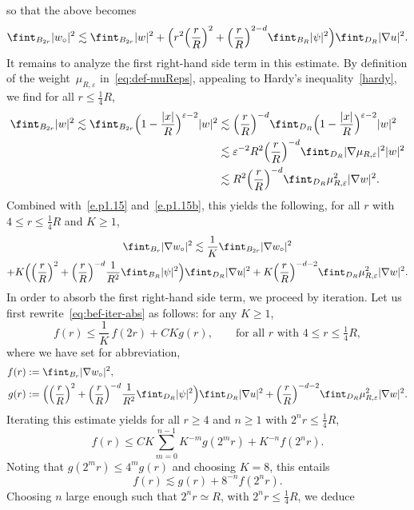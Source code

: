 \documentclass[10pt]{amsart}
\theoremstyle{plain}
\theoremstyle{definition}
\newcommand{\e}{\varepsilon}
\begin{document}
so that the above becomes
\begin{equation}\label{e.p1.15b}
\fint_{B_{2r}} |w_\circ|^2 \lesssim \fint_{B_{2r}} |w|^2 + \Big(r^2\Bigl(\frac{r}{R}\Bigr)^2+\Bigl(\frac{r}{R}\Bigr)^{2-d}\fint_{B_{R}} |\psi|^2\Big) \fint_{D_R}|\nabla u|^2.
\end{equation}
It remains to analyze the first right-hand side term in this estimate.
By definition of the weight~$\mu_{R,\e}$ in~\eqref{eq:def-muReps}, appealing to Hardy's inequality~\eqref{hardy},
we find for all $r\le \frac14R$,
\begin{align*}
\fint_{B_{2r}} |w|^2 \lesssim \fint_{B_{2r}} \Big(1-\frac{|x|}{R}\Big)^{\e-2} |w|^2
&\lesssim \Bigl(\frac{r}{R}\Bigr)^{-d} \fint_{D_{R}} \Big(1-\frac{|x|}{R}\Big)^{\e-2}|w|^2\\
&\lesssim \e^{-2} R^2\Bigl(\frac{r}{R}\Bigr)^{-d} \fint_{D_{R}} |\nabla \mu_{R,\e}|^2 |w|^2\\
&\lesssim R^2\Bigl(\frac{r}{R}\Bigr)^{-d}\fint_{D_R} \mu_{R,\e}^2 |\nabla w|^2.
\end{align*}
Combined with~\eqref{e.p1.15} and~\eqref{e.p1.15b}, this yields the following, for all $r$ with $4\le r\le \frac14R$ and $K\ge1$,
\begin{multline}\label{eq:bef-iter-abs}
\fint_{B_{r}}|\nabla w_\circ|^2\lesssim \frac1K\fint_{B_{2r}}|\nabla w_\circ|^2\\
+ K\Big(\Bigl(\frac{r}{R}\Bigr)^2+\Bigl(\frac{r}{R}\Bigr)^{-d}\frac1{R^2}\fint_{B_{R}} |\psi|^2\Big) \fint_{D_R}|\nabla u|^2+K\Bigl(\frac{r}{R}\Bigr)^{-d-2}\fint_{D_R} \mu_{R,\e}^2 |\nabla w|^2.
\end{multline}
In order to absorb the first right-hand side term, we proceed by iteration. Let us first rewrite~\eqref{eq:bef-iter-abs} as follows: for any $K\ge1$,
\[f(r)\le \frac1K\,f(2r)+CKg(r),\qquad\text{for all $r$ with $4\le r\le\tfrac14R$},\]
where we have set for abbreviation,
\begin{align*}
f(r)&:= \fint_{B_r} |\nabla w_\circ|^2,\\
g(r)&:= \Big( \Bigl(\frac{r}{R}\Bigr)^2+\Bigl(\frac{r}{R}\Bigr)^{-d}\frac1{R^2} \fint_{D_R} |\psi|^2 \Big)\fint_{D_R} |\nabla u|^2
+\Bigl(\frac{r}{R}\Bigr)^{-d-2}\fint_{D_R} \mu_{R,\e}^2 |\nabla w|^2.
\end{align*}
Iterating this estimate yields for all $r\ge4$ and $n\ge1$ with $2^nr\le\frac14R$,
\[f(r)\le CK\sum_{m=0}^{n-1} K^{-m}g(2^mr)+K^{-n}f(2^nr).\]
Noting that $g(2^mr)\le 4^mg(r)$ and choosing $K=8$, this entails
\[f(r)\lesssim g(r)+8^{-n}f(2^nr).\]
Choosing $n$ large enough such that $2^nr\simeq R$, with $2^nr\le\frac14R$, we deduce
\end{document}
